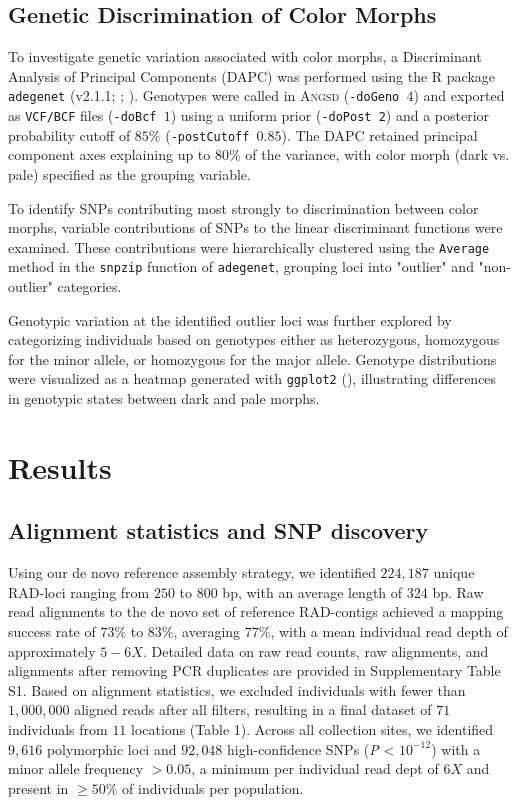 \documentclass[9pt,a4paper,twoside]{rho-class/rho}
\begin{document}
    \subsection{Genetic Discrimination of Color Morphs}
        To investigate genetic variation associated with color morphs, a Discriminant Analysis of Principal Components (DAPC) was performed using the R package \texttt{adegenet} (v2.1.1; \cite{Jombart2008}; \cite{Jombart2011}). Genotypes were called in \textsc{Angsd} (\texttt{-doGeno $4$}) and exported as \texttt{VCF/BCF} files (\texttt{-doBcf $1$}) using a uniform prior (\texttt{-doPost 2}) and a posterior probability cutoff of $85\%$ (\texttt{-postCutoff $0.85$}). The DAPC retained principal component axes explaining up to $80\%$ of the variance, with color morph (dark vs. pale) specified as the grouping variable.
        
        To identify SNPs contributing most strongly to discrimination between color morphs, variable contributions of SNPs to the linear discriminant functions were examined. These contributions were hierarchically clustered using the \texttt{Average} method in the \texttt{snpzip} function of \texttt{adegenet}, grouping loci into "outlier" and "non-outlier" categories.
        
        Genotypic variation at the identified outlier loci was further explored by categorizing individuals based on genotypes either as heterozygous, homozygous for the minor allele, or homozygous for the major allele. Genotype distributions were visualized as a heatmap generated with \texttt{ggplot2} (\cite{ggplot2}), illustrating differences in genotypic states between dark and pale morphs.

\section{Results}

    \subsection{Alignment statistics and SNP discovery}

        Using our de novo reference assembly strategy, we identified $224,187$ unique RAD-loci ranging from $250$ to $800$ bp, with an average length of $324$ bp. Raw read alignments to the de novo set of reference RAD-contigs achieved a mapping success rate of $73\%$ to $83\%$, averaging $77\%$, with a mean individual read depth of approximately $5-6X$. Detailed data on raw read counts, raw alignments, and alignments after removing PCR duplicates are provided in Supplementary Table S1. Based on alignment statistics, we excluded individuals with fewer than $1,000,000$ aligned reads after all filters, resulting in a final dataset of $71$ individuals from $11$ locations (Table 1). Across all collection sites, we identified $9,616$ polymorphic loci and $92,048$ high-confidence SNPs (\textit{P} < $10^{-12}$) with a minor allele frequency $>0.05$, a minimum per individual read dept of $6X$ and present in $\geq50\%$ of individuals per population.
        
\end{document}
